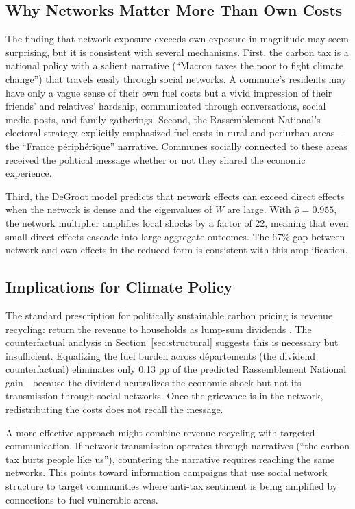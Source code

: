 \documentclass[12pt]{article}
\newcommand{\rn}{Rassemblement National}
\newcommand{\depts}{d\'{e}partements}
\begin{document}
\subsection{Why Networks Matter More Than Own Costs}

The finding that network exposure exceeds own exposure in magnitude may seem surprising, but it is consistent with several mechanisms. First, the carbon tax is a national policy with a salient narrative (``Macron taxes the poor to fight climate change'') that travels easily through social networks. A commune's residents may have only a vague sense of their own fuel costs but a vivid impression of their friends' and relatives' hardship, communicated through conversations, social media posts, and family gatherings. Second, the \rn{}'s electoral strategy explicitly emphasized fuel costs in rural and periurban areas---the ``France p\'{e}riph\'{e}rique'' narrative. Communes socially connected to these areas received the political message whether or not they shared the economic experience.

Third, the DeGroot model predicts that network effects can exceed direct effects when the network is dense and the eigenvalues of $W$ are large. With $\hat{\rho} = 0.955$, the network multiplier amplifies local shocks by a factor of 22, meaning that even small direct effects cascade into large aggregate outcomes. The 67\% gap between network and own effects in the reduced form is consistent with this amplification.

\subsection{Implications for Climate Policy}

The standard prescription for politically sustainable carbon pricing is revenue recycling: return the revenue to households as lump-sum dividends \citep{klenert2018carbon, stiglitz2019addressing}. The counterfactual analysis in Section~\ref{sec:structural} suggests this is necessary but insufficient. Equalizing the fuel burden across \depts{} (the dividend counterfactual) eliminates only 0.13 pp of the predicted \rn{} gain---because the dividend neutralizes the economic shock but not its transmission through social networks. Once the grievance is in the network, redistributing the costs does not recall the message.

A more effective approach might combine revenue recycling with targeted communication. If network transmission operates through narratives (``the carbon tax hurts people like us''), countering the narrative requires reaching the same networks. This points toward information campaigns that use social network structure to target communities where anti-tax sentiment is being amplified by connections to fuel-vulnerable areas.
\end{document}
